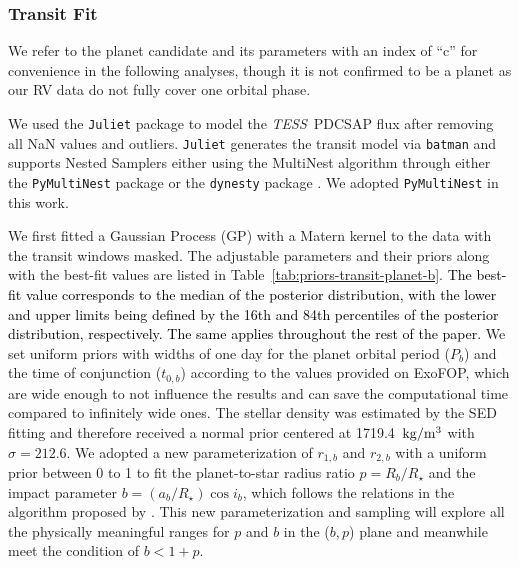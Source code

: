 \documentclass[twocolumn]{aastex631}
\newcommand{\rev}[1]{\textcolor{black}{#1}}
\newcommand{\code}[1]{{\texttt{#1}}}
\newcommand{\tess}{\textit{TESS}\ }
\begin{document}
\subsubsection{Transit Fit}
\label{sec:transit-fit-784b}

We refer to the planet candidate and its parameters with an index of ``c'' for convenience in the following analyses, though it is not confirmed to be a planet as our RV data do not fully cover one orbital phase.

We used the \code{Juliet} package \citep{Espinoza2019} to model the \tess PDCSAP flux after removing all NaN values and outliers. \code{Juliet} generates the transit model via \code{batman} \citep{Kreidberg2015} and supports Nested Samplers either using the MultiNest algorithm \citep{multinest2008, multinest2013, multinest2019} through either the \code{PyMultiNest} package \citep{pymultinest} or the \code{dynesty} package \citep{dynesty}. We adopted \code{PyMultiNest} in this work.

We first fitted a Gaussian Process (GP) with a Matern kernel to the data with the transit windows masked. The adjustable parameters and their priors along with the best-fit values are listed in Table~\ref{tab:priors-transit-planet-b}. \rev{The best-fit value corresponds to the median of the posterior distribution, with the lower and upper limits being defined by the 16th and 84th percentiles of the posterior distribution, respectively. The same applies throughout the rest of the paper.} We set uniform priors with widths of one day for the planet orbital period ($P_b$) and the time of conjunction ($t_{0,b}$) according to the values provided on ExoFOP, which are wide enough to not influence the results and can save the computational time compared to infinitely wide ones. The stellar density was estimated by the SED fitting and therefore received a normal prior centered at 1719.4~$\rm{kg/m^3}$ with $\sigma=212.6$. We adopted a new parameterization of $r_{1,b}$ and $r_{2,b}$ with a uniform prior between 0 to 1 to fit the planet-to-star radius ratio $p = R_b/R_{\star}$ and the impact parameter $b = (a_b/R_{\star})\cos i_b$, which follows the relations in the algorithm proposed by \cite{Espinoza2018}. This new parameterization and sampling will explore all the physically meaningful ranges for $p$ and $b$ in the ($b, p$) plane and meanwhile meet the condition of $b < 1+p$. 
\end{document}
